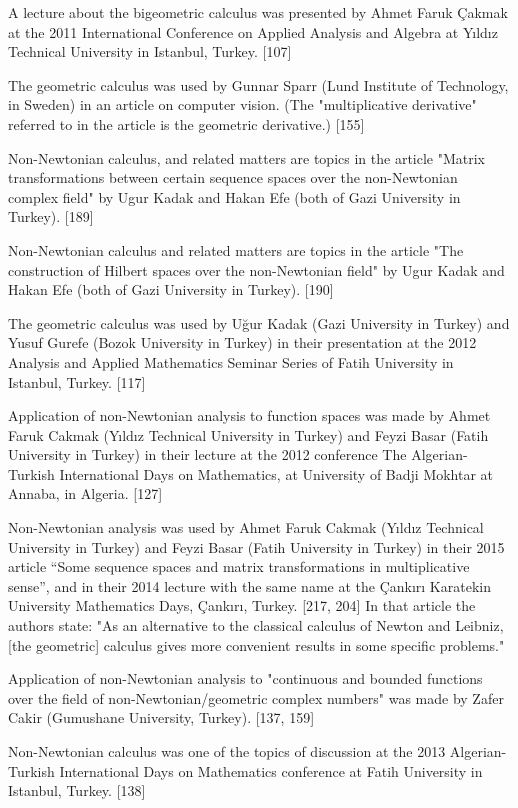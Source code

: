 \documentclass[12pt]{article}
\begin{document}
A lecture about the bigeometric calculus was presented by Ahmet Faruk Çakmak at the 2011 International Conference on Applied Analysis and Algebra at Yıldız Technical University in Istanbul, Turkey. [107]

The geometric calculus was used by Gunnar Sparr (Lund Institute of Technology, in Sweden) in an article on computer vision. (The "multiplicative derivative" referred to in the article is the geometric derivative.) [155]

Non-Newtonian calculus, and related matters are topics in the article "Matrix transformations between certain sequence spaces over the non-Newtonian complex field" by Ugur Kadak and Hakan Efe (both of Gazi University in Turkey). [189]

Non-Newtonian calculus and related matters are topics in the article "The construction of Hilbert spaces over the non-Newtonian field" by Ugur Kadak and Hakan Efe (both of Gazi University in Turkey). [190]

The geometric calculus was used by Uğur Kadak (Gazi University in Turkey) and Yusuf Gurefe (Bozok University in Turkey) in their presentation at the 2012 Analysis and Applied Mathematics Seminar Series of Fatih University in Istanbul, Turkey. [117]

Application of non-Newtonian analysis to function spaces was made by Ahmet Faruk Cakmak (Yıldız Technical University in Turkey) and Feyzi Basar (Fatih University in Turkey) in their lecture at the 2012 conference The Algerian-Turkish International Days on Mathematics, at University of Badji Mokhtar at Annaba, in Algeria. [127]

Non-Newtonian analysis was used by Ahmet Faruk Cakmak (Yıldız Technical University in Turkey) and Feyzi Basar (Fatih University in Turkey) in their 2015 article “Some sequence spaces and matrix transformations in multiplicative sense”, and in their 2014 lecture with the same name at the Çankırı Karatekin University Mathematics Days, Çankırı, Turkey. [217, 204] In that article the authors state: "As an alternative to the classical calculus of Newton and Leibniz, [the geometric] calculus gives more convenient results in some specific problems."

Application of non-Newtonian analysis to "continuous and bounded functions over the field of non-Newtonian/geometric complex numbers" was made by Zafer Cakir (Gumushane University, Turkey). [137, 159]

Non-Newtonian calculus was one of the topics of discussion at the 2013 Algerian-Turkish International Days on Mathematics conference at Fatih University in Istanbul, Turkey. [138]
\end{document}
